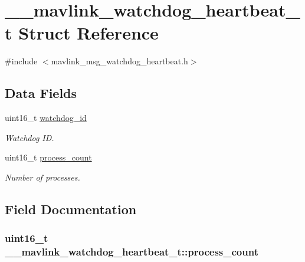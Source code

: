 \hypertarget{struct____mavlink__watchdog__heartbeat__t}{\section{\+\_\+\+\_\+mavlink\+\_\+watchdog\+\_\+heartbeat\+\_\+t Struct Reference}
\label{struct____mavlink__watchdog__heartbeat__t}
}


{\ttfamily \#include $<$mavlink\+\_\+msg\+\_\+watchdog\+\_\+heartbeat.\+h$>$}

\subsection*{Data Fields}
\begin{DoxyCompactItemize}
\item 
uint16\+\_\+t \hyperlink{struct____mavlink__watchdog__heartbeat__t_a0e5537342f2663091c7157206c9790f1}{watchdog\+\_\+id}
\begin{DoxyCompactList}\small\item\em Watchdog I\+D. \end{DoxyCompactList}\item 
uint16\+\_\+t \hyperlink{struct____mavlink__watchdog__heartbeat__t_a94849df657d7450af693768db9da54ba}{process\+\_\+count}
\begin{DoxyCompactList}\small\item\em Number of processes. \end{DoxyCompactList}\end{DoxyCompactItemize}


\subsection{Field Documentation}
\hypertarget{struct____mavlink__watchdog__heartbeat__t_a94849df657d7450af693768db9da54ba}{
\subsubsection[{process\+\_\+count}]{\setlength{\rightskip}{0pt plus 5cm}uint16\+\_\+t \+\_\+\+\_\+mavlink\+\_\+watchdog\+\_\+heartbeat\+\_\+t\+::process\+\_\+count}}\label{struct____mavlink__watchdog__heartbeat__t_a94849df657d7450af693768db9da54ba}


